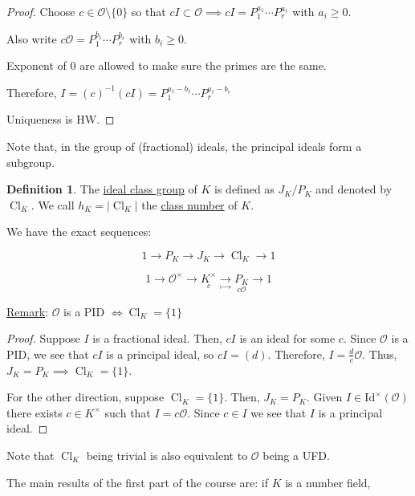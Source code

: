 \documentclass[openany]{amsbook}
\numberwithin{section}{chapter}
\theoremstyle{definition}
\newtheorem*{definition}{Definition}
\newcommand{\Cl}{\operatorname{Cl}}
\begin{document}
\begin{proof}
    Choose \(c \in \mathcal{O} \setminus \{ 0 \} \) so that \(cI \subset \mathcal{O} \implies cI = P_1^{a_1}\cdots P_r^{a_r}\) with \(a_i \geq 0\).

    Also write \(c \mathcal{O} = P_1^{b_1}\cdots P_r^{b_r}\) with \(b_i \geq 0\).

    Exponent of \(0\) are allowed to make sure the primes are the same.

    Therefore, \(I = (c)^{-1} (cI) = P_1^{a_1 - b_1} \cdots P_r^{a_r - b_r}\) 

    Uniqueness is HW.

\end{proof}

Note that, in the group of (fractional) ideals, the principal ideals form a subgroup.

\begin{definition}
    The \underline{ideal class group} of \(K\) is defined as \(J_K / P_K\) and denoted by \(\Cl_K\). We call \(h_K = \vert \Cl_K \vert \) the \underline{class number} of \(K\).
\end{definition}

We have the exact sequences:

\[
    1 \to P_K \to J_K \to \Cl_K \to 1
\]

\[
    1 \to \mathcal{O} ^\times \to \underset{c}{K^\times} \underset{\mapsto}{\to} \underset{c \mathcal{O}}{P_K} \to 1
\]

\underline{Remark}: \(\mathcal{O}\) is a PID \(\iff \Cl_K = \{ 1 \}\)

\begin{proof}
    Suppose \(I\) is a fractional ideal. Then, \(cI\) is an ideal for some \(c\). Since \(\mathcal{O}\) is a PID, we see that \(cI\) is a principal ideal, so \(cI = (d)\). Therefore, \(I = \frac{d}{c} \mathcal{O}\). Thus, \(J_K = P_K \implies \Cl_K = \{ 1 \}\).

    For the other direction, suppose \(\Cl_K = \{ 1 \}\). Then, \(J_K = P_K\). Given \(I \in \operatorname{Id^\times }(\mathcal{O})\) there exists \(c\in K^\times\) such that \(I = c \mathcal{O}\). Since \(c\in I\) we see that \(I\) is a principal ideal. 
\end{proof}

Note that \(\Cl_K\) being trivial is also equivalent to \(\mathcal{O}\) being a UFD.

The main results of the first part of the course are: if \(K\) is a number field,
\end{document}
